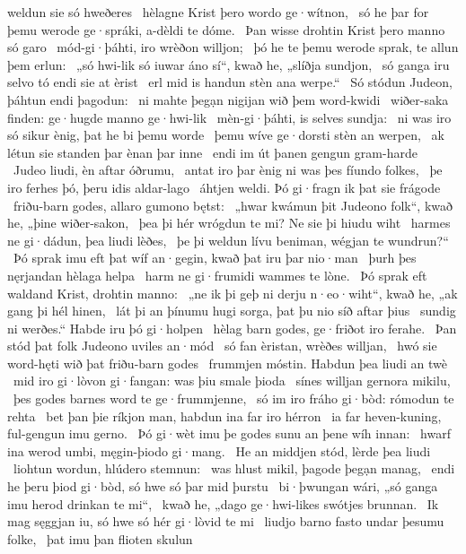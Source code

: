 weldun sie só hweðeres \hld\ hèlagne Krist
þero wordo ge·wítnon, \hld\ só he þar for þemu werode ge·spráki,
a-dèldi te dóme. \hld\ Þan wisse drohtin Krist
þero manno só garo \hld\ mód-gi·þáhti,
iro wrèðon willjon; \hld\ þó he te þemu werode sprak,
te allun þem erlun: \hld\ „só hwi-lik só iuwar áno sí“, kwað he,
„slíðja sundjon, \hld\ só ganga iru selvo tó
endi sie at èrist \hld\ erl mid is handun
stèn ana werpe.“ \hld\ Só stódun Judeon,
þáhtun endi þagodun: \hld\ ni mahte þegạn nigijan
wið þem word-kwidi \hld\ wiðer-saka finden:
ge·hugde manno ge·hwi-lik \hld\ mèn-gi·þáhti,
is selves sundja: \hld\ ni was iro só sikur ènig,
þat he bi þemu worde \hld\ þemu wíve ge·dorsti
stèn an werpen, \hld\ ak létun sie standen þar
ènan þar inne \hld\ endi im út þanen
gengun gram-harde \hld\ Judeo liudi,
èn aftar óðrumu, \hld\ antat iro þar ènig ni was
þes fíundo folkes, \hld\ þe iro ferhes þó,
þeru idis aldar-lago \hld\ áhtjen weldi.
Þó gi·fragn ik þat sie frágode \hld\ friðu-barn godes,
allaro gumono bętst: \hld\ „hwar kwámun þit Judeono folk“, kwað he,
„þine wiðer-sakon, \hld\ þea þi hér wrógdun te mi?
Ne sie þi hiudu wiht \hld\ harmes ne gi·dádun,
þea liudi lèðes, \hld\ þe þi weldun lívu beniman,
wégjan te wundrun?“ \hld\ Þó sprak imu eft þat wíf an·gegin,
kwað þat iru þar nio·man \hld\ þurh þes nęrjandan
hèlaga helpa \hld\ harm ne gi·frumidi
wammes te lòne. \hld\ Þó sprak eft waldand Krist,
drohtin manno: \hld\ „ne ik þi geþ ni derju n·eo·wiht“, kwað he,
„ak gang þi hél hinen, \hld\ lát þi an þínumu hugi sorga,
þat þu nio síð aftar þius \hld\ sundig ni werðes.“
Habde iru þó gi·holpen \hld\ hèlag barn godes,
ge·friðot iro ferahe. \hld\ Þan stód þat folk Judeono
uviles an·mód \hld\ só fan èristan,
wrèðes willjan, \hld\ hwó sie word-hęti
wið þat friðu-barn godes \hld\ frummjen móstin.
Habdun þea liudi an twè \hld\ mid iro gi·lòvon gi·fangan:
was þiu smale þioda \hld\ sínes willjan
gernora mikilu, \hld\ þes godes barnes word
te ge·frummjenne, \hld\ só im iro fráho gi·bòd:
rómodun te rehta \hld\ bet þan þie ríkjon man,
habdun ina far iro hérron \hld\ ia far heven-kuning,
ful-gengun imu gerno. \hld\ Þó gi·wèt imu þe godes sunu
an þene wíh innan: \hld\ hwarf ina werod umbi,
męgin-þiodo gi·mang. \hld\ He an middjen stód,
lèrde þea liudi \hld\ liohtun wordun,
hlúdero stemnun: \hld\ was hlust mikil,
þagode þegạn manag, \hld\ endi he þeru þiod gi·bòd,
só hwe só þar mid þurstu \hld\ bi·þwungan wári,
„só ganga imu herod drinkan te mi“, \hld\ kwað he, „dago ge·hwi-likes
swótjes brunnan. \hld\ Ik mag sęggjan iu,
só hwe só hér gi·lòvid te mi \hld\ liudjo barno
fasto undar þesumu folke, \hld\ þat imu þan flioten skulun
